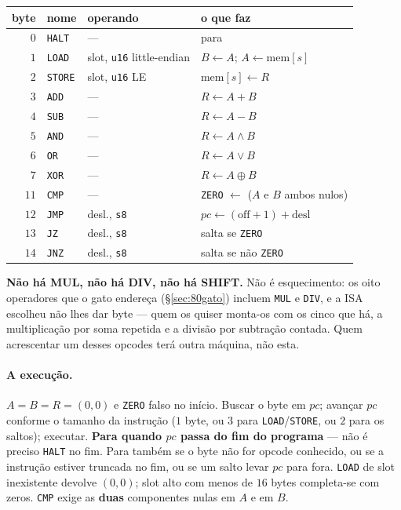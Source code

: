 \documentclass[11pt]{article}
\newcommand{\code}[1]{\texttt{\small #1}}
\theoremstyle{plain}
\theoremstyle{remark}
\begin{document}
\begin{center}
\begin{tabular}{@{}rlll@{}}
\toprule
byte & nome & operando & o que faz \\
\midrule
$0$ & \code{HALT} & --- & para \\
$1$ & \code{LOAD} & slot, \code{u16} little-endian & $B\leftarrow A$; $A\leftarrow \mathrm{mem}[s]$ \\
$2$ & \code{STORE} & slot, \code{u16} LE & $\mathrm{mem}[s]\leftarrow R$ \\
$3$ & \code{ADD} & --- & $R\leftarrow A+B$ \\
$4$ & \code{SUB} & --- & $R\leftarrow A-B$ \\
$5$ & \code{AND} & --- & $R\leftarrow A\wedge B$ \\
$6$ & \code{OR} & --- & $R\leftarrow A\vee B$ \\
$7$ & \code{XOR} & --- & $R\leftarrow A\oplus B$ \\
$11$ & \code{CMP} & --- & \code{ZERO} $\leftarrow$ ($A$ e $B$ ambos nulos) \\
$12$ & \code{JMP} & desl., \code{s8} & $pc\leftarrow(\text{off}+1)+\text{desl}$ \\
$13$ & \code{JZ} & desl., \code{s8} & salta se \code{ZERO} \\
$14$ & \code{JNZ} & desl., \code{s8} & salta se não \code{ZERO} \\
\bottomrule
\end{tabular}
\end{center}

\noindent \textbf{Não há MUL, não há DIV, não há SHIFT.} Não é esquecimento: os oito
operadores que o gato endereça (\S\ref{sec:80gato}) incluem \code{MUL} e
\code{DIV}, e a ISA escolheu não lhes dar byte --- quem os quiser monta-os com
os cinco que há, a multiplicação por soma repetida e a divisão por subtração
contada. Quem acrescentar um desses opcodes terá outra máquina, não esta.

\paragraph{A execução.} $A=B=R=(0,0)$ e \code{ZERO} falso no início. Buscar o
byte em $pc$; avançar $pc$ conforme o tamanho da instrução ($1$ byte, ou $3$
para \code{LOAD}/\code{STORE}, ou $2$ para os saltos); executar. \textbf{Para
quando $pc$ passa do fim do programa} --- não é preciso \code{HALT} no fim.
Para também se o byte não for opcode conhecido, ou se a instrução estiver
truncada no fim, ou se um salto levar $pc$ para fora. \code{LOAD} de slot
inexistente devolve $(0,0)$; slot alto com menos de $16$ bytes completa-se com
zeros. \code{CMP} exige as \textbf{duas} componentes nulas em $A$ e em $B$.
\end{document}
